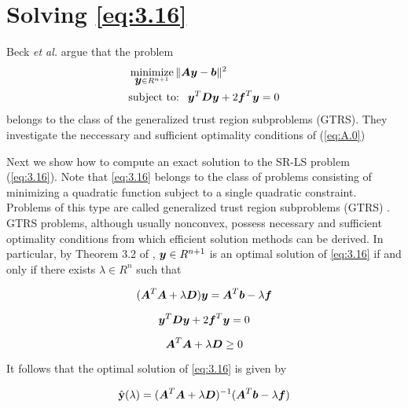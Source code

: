 \startappendix{}
\label{chapter:app1}

\section{Solving \ref{eq:3.16}}

Beck \textit{et al.} \cite{BeckStLi} argue that the problem 
\begin{equation} \label{eq:A.0}
\begin{aligned}
&\mathop{\mbox{minimize}}_{{\mbox{\boldmath$y$}} \in R^{n+1}} \|\mbox{\boldmath$A$}\mbox{\boldmath$y$}-\mbox{\boldmath$b$}\|^2 \\
&\mbox{subject to: \ }  \mbox{\boldmath$y$}^T\mbox{\boldmath$D$}\mbox{\boldmath$y$} + 2\mbox{\boldmath$f$}^T\mbox{\boldmath$y$} = 0
\end{aligned}
\end{equation} 
belongs to the class of the generalized trust region subproblems (GTRS). They investigate the neccessary and sufficient optimality conditions of (\ref{eq:A.0})

Next we show how to compute an exact solution to the SR-LS problem
(\ref{eq:3.16}). Note that \ref{eq:3.16} belongs to the class of problems
consisting of minimizing a quadratic function subject to a single
quadratic constraint. Problems of this type are called generalized trust
region subproblems (GTRS) \cite{More}. GTRS problems, although usually 
nonconvex, possess necessary and sufficient optimality conditions from
which efficient solution methods can be derived. In particular, by 
Theorem 3.2 of \cite{More}, $\mbox{\boldmath$y$} \in R^{n+1}$ is an optimal solution
of \ref{eq:3.16} if and only if there exists $\lambda \in R^{n}$ 
such that

\begin{equation} \label{eq:A.1}
(\mbox{\boldmath$A$}^{T}\mbox{\boldmath$A$} + \lambda\mbox{\boldmath$D$})\mbox{\boldmath$y$} = \mbox{\boldmath$A$}^{T}\mbox{\boldmath$b$} - \lambda\mbox{\boldmath$f$}
\end{equation}

\begin{equation} \label{eq:A.2}
\mbox{\boldmath$y$}^{T}\mbox{\boldmath$D$}\mbox{\boldmath$y$} + 2\mbox{\boldmath$f$}^{T}\mbox{\boldmath$y$} = 0
\end{equation}

\begin{equation} \label{eq:A.3}
\mbox{\boldmath$A$}^{T}\mbox{\boldmath$A$} + \lambda\mbox{\boldmath$D$} \geq 0
\end{equation}

It follows that the optimal solution of \ref{eq:3.16} is given by

\begin{equation} \label{eq:A.4}
\hat{\mathbf{y}}(\lambda) = (\mbox{\boldmath$A$}^{T}\mbox{\boldmath$A$} + \lambda\mbox{\boldmath$D$})^{-1}(\mbox{\boldmath$A$}^{T}\mbox{\boldmath$b$} - \lambda\mbox{\boldmath$f$})
\end{equation}

